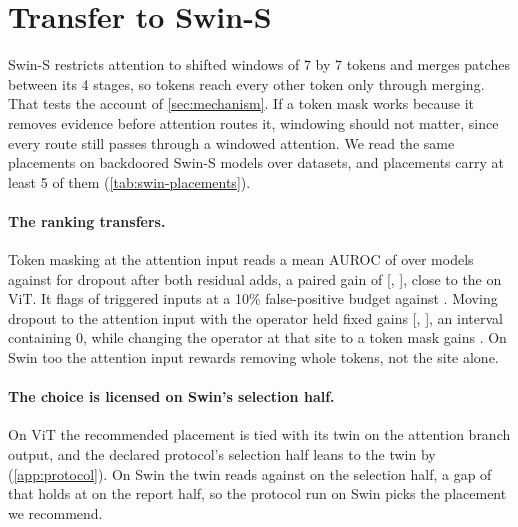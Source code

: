 \section{Transfer to Swin-S}
\label{sec:swin}

Swin-S \cite{liu2021swin} restricts attention to shifted windows of 7 by 7 tokens and merges patches between its 4 stages, so tokens reach every other token only through merging. That tests the account of \cref{sec:mechanism}. If a token mask works because it removes evidence before attention routes it, windowing should not matter, since every route still passes through a windowed attention. We read the same placements on \SwinCells{} backdoored Swin-S models over \SwinDatasets{} datasets, and \SwinPlacementsReported{} placements carry at least 5 of them (\cref{tab:swin-placements}).



\paragraph{The ranking transfers.}
Token masking at the attention input reads a mean AUROC of \SwinRecommendedAurocAdaptive{} over \SwinRecommendedN{} models against \SwinPublishedAurocAdaptive{} for dropout after both residual adds, a paired gain of \SwinGainRecommendedMinusPublished{} [\SwinGainRecommendedMinusPublishedLow{}, \SwinGainRecommendedMinusPublishedHigh{}], close to the \HeadlineGainAdaptiveAuroc{} on ViT. It flags \SwinRecommendedTprOneZero{} of triggered inputs at a 10\% false-positive budget against \SwinPublishedTprOneZero{}. Moving dropout to the attention input with the operator held fixed gains \SwinGainDropoutInputMinusPublished{} [\SwinGainDropoutInputMinusPublishedLow{}, \SwinGainDropoutInputMinusPublishedHigh{}], an interval containing 0, while changing the operator at that site to a token mask gains \SwinGainRecommendedMinusSameSiteDropout{}. On Swin too the attention input rewards removing whole tokens, not the site alone.

\paragraph{The choice is licensed on Swin's selection half.}
On ViT the recommended placement is tied with its twin on the attention branch output, and the declared protocol's selection half leans to the twin by \GainsSelectionHalfTwinGap{} (\cref{app:protocol}). On Swin the twin reads \SwinSelectionHalfTwinAuroc{} against \SwinSelectionHalfRecommendedAuroc{} on the selection half, a gap of \SwinSelectionHalfTwinGap{} that holds at \SwinReportHalfTwinGap{} on the report half, so the protocol run on Swin picks the placement we recommend.

